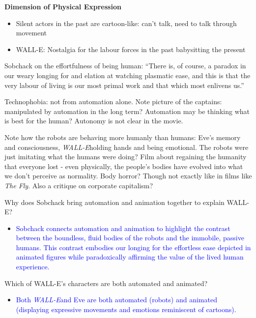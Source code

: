 \documentclass[11pt,fleqn]{book} %
\begin{document}
\textbf{Dimension of Physical Expression}
\begin{itemize}
    \item Silent actors in the past are cartoon-like: can't talk, need to talk through movement
    \item WALL-E: Nostalgia for the labour forces in the past babysitting the present
\end{itemize}
\begin{remark}
    Sobchack on the effortfulness of being human: \enquote{There is, of course, a paradox in our weary longing for and elation at watching plasmatic ease, and this is that the very labour of living is our most primal work and that which most enlivens us.}
\end{remark}
\begin{remark}
    Technophobia: not from automation alone. Note picture of the captains: manipulated by automation in the long term? Automation may be thinking what is best for the human? Autonomy is not clear in the movie. 
\end{remark}
\begin{remark}
    Note how the robots are behaving more humanly than humans: Eve's memory and consciousness, \textit{WALL-E}holding hands and being emotional. The robots were just imitating what the humans were doing? Film about regaining the humanity that everyone lost - even physically, the people's bodies have evolved into what we don't perceive as normality. Body horror? Though not exactly like in films like \textit{The Fly}. Also a critique on corporate capitalism?
\end{remark}

\begin{exercise}
Why does Sobchack bring automation and animation together to explain WALL-E?
\begin{itemize}
\item \textcolor{blue}{Sobchack connects automation and animation to highlight the contrast between the boundless, fluid bodies of the robots and the immobile, passive humans. This contrast embodies our longing for the effortless ease depicted in animated figures while paradoxically affirming the value of the lived human experience.}
\end{itemize}
\end{exercise}

\begin{exercise}
Which of WALL-E's characters are both automated and animated?
\begin{itemize}
\item \textcolor{blue}{Both \textit{WALL-E}and Eve are both automated (robots) and animated (displaying expressive movements and  emotions reminiscent of cartoons).}
\end{itemize}
\end{exercise}
\end{document}
